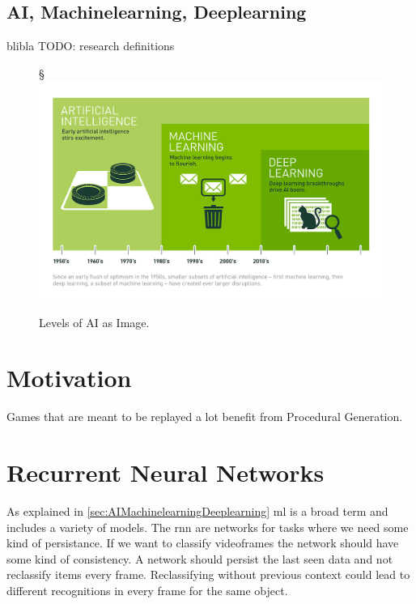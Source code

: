 \documentclass[10pt,a4paper]{article}
\begin{document}
\subsection{AI, Machinelearning, Deeplearning}
\label{sec:AIMachinelearningDeeplearning}
blibla \cite{MichaelCopeland2016} TODO: research definitions
\begin{figure}[H]§
	\includegraphics[width=\textwidth, height=\textheight, keepaspectratio]{Deep_Learning_Icons_R5.png}
	\caption{Levels of AI as Image. \cite{MichaelCopeland2016}}
\end{figure}

\section{Motivation}
Games that are meant to be replayed a lot benefit from Procedural Generation.

\section{Recurrent Neural Networks}
As explained in \autoref{sec:AIMachinelearningDeeplearning} \gls{ml} is a broad term and includes a variety of models. The \gls{rnn} are networks for tasks where we need some kind of persistance. If we want to classify videoframes the network should have some kind of consistency.\cite{Olah2015} A network should persist the last seen data and not reclassify items every frame. Reclassifying without previous context could lead to different recognitions in every frame for the same object.
\end{document}
